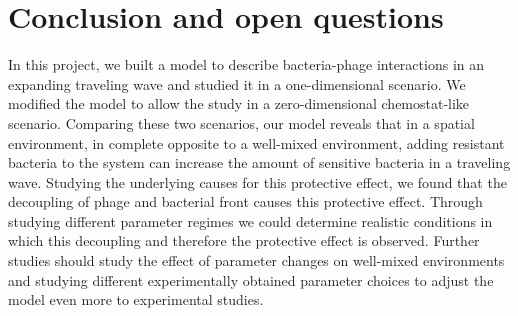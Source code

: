 \chapter{Conclusion and open questions}
\label{chap:conclusion}

In this project, we built a model to describe bacteria-phage interactions in an expanding traveling wave and studied it in a one-dimensional scenario. We modified the model to allow the study in a zero-dimensional chemostat-like scenario. 
Comparing these two scenarios, our model reveals that in a spatial environment, in complete opposite to a well-mixed environment, adding resistant bacteria to the system can increase the amount of sensitive bacteria in a traveling wave.
Studying the underlying causes for this protective effect, we found that the decoupling of phage and bacterial front causes this protective effect. Through studying different parameter regimes we could determine realistic conditions in which this decoupling and therefore the protective effect is observed.
Further studies should study the effect of parameter changes on well-mixed environments and studying different experimentally obtained parameter choices to adjust the model even more to experimental studies.
